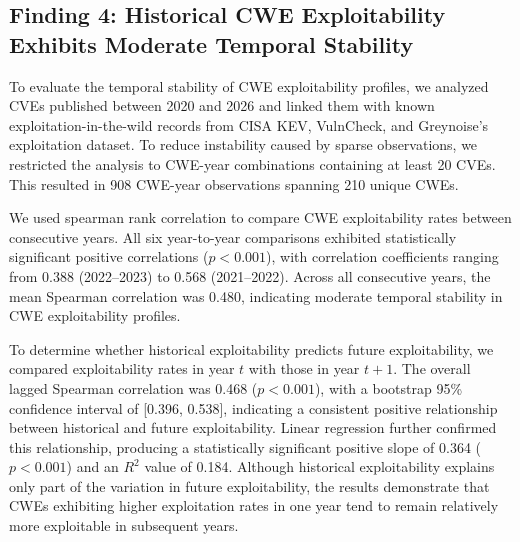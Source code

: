 \documentclass[conference,compsoc]{IEEEtran}
\begin{document}




\subsection{Finding 4: Historical CWE Exploitability Exhibits Moderate Temporal Stability}

To evaluate the temporal stability of CWE exploitability profiles, we analyzed CVEs published between 2020 and 2026 and linked them with known exploitation-in-the-wild records from CISA KEV, VulnCheck, and Greynoise's exploitation dataset. To reduce instability caused by sparse observations, we restricted the analysis to CWE-year combinations containing at least 20 CVEs. This resulted in 908 CWE-year observations spanning 210 unique CWEs.

We used spearman rank correlation to compare CWE exploitability rates between consecutive years. All six year-to-year comparisons exhibited statistically significant positive correlations ($p<0.001$), with correlation coefficients ranging from 0.388 (2022--2023) to 0.568 (2021--2022). Across all consecutive years, the mean Spearman correlation was 0.480, indicating moderate temporal stability in CWE exploitability profiles.

To determine whether historical exploitability predicts future exploitability, we compared exploitability rates in year $t$ with those in year $t+1$. The overall lagged Spearman correlation was 0.468 ($p<0.001$), with a bootstrap 95\% confidence interval of [0.396, 0.538], indicating a consistent positive relationship between historical and future exploitability. Linear regression further confirmed this relationship, producing a statistically significant positive slope of 0.364 ($p<0.001$) and an $R^2$ value of 0.184. Although historical exploitability explains only part of the variation in future exploitability, the results demonstrate that CWEs exhibiting higher exploitation rates in one year tend to remain relatively more exploitable in subsequent years.
\end{document}
